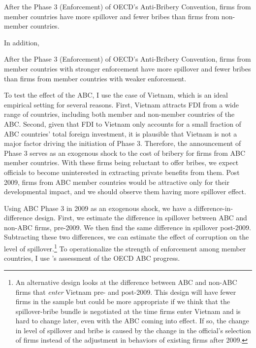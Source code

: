 \begin{hyp}
After the Phase 3 (Enforcement) of OECD's Anti-Bribery Convention, firms from member countries have more spillover and fewer bribes than firms from non-member countries.
\end{hyp}

In addition,

\begin{hyp}
After the Phase 3 (Enforcement) of OECD's Anti-Bribery Convention, firms from member countries with stronger enforcement have more spillover and fewer bribes than firms from member countries with weaker enforcement.
\end{hyp}

To test the effect of the ABC, I use the case of Vietnam, which is an ideal empirical setting for several reasons. First, Vietnam attracts FDI from a wide range of countries, including both member and non-member countries of the ABC. Second, given that FDI to Vietnam only accounts for a small fraction of ABC countries' total foreign investment, it is plausible that Vietnam is not a major factor driving the initiation of Phase 3. Therefore, the announcement of Phase 3 serves as an exogenous shock to the cost of bribery for firms from ABC member countries. With these firms being reluctant to offer bribes, we expect officials to become uninterested in extracting private benefits from them. Post 2009, firms from ABC member countries would be attractive only for their developmental impact, and we should observe them having more spillover effect.

Using ABC Phase 3 in 2009 as an exogenous shock, we have a difference-in-difference design. First, we estimate the difference in spillover between ABC and non-ABC firms, pre-2009. We then find the same difference in spillover post-2009. Subtracting these two differences, we can estimate the effect of corruption on the level of spillover.\footnote{An alternative design looks at the difference between ABC and non-ABC firms that \textit{enter} Vietnam pre- and post-2009. This design will have fewer firms in the sample but could be more appropriate if we think that the spillover-bribe bundle is negotiated at the time firms enter Vietnam and is hard to change later, even with the ABC coming into effect. If so, the change in level of spillover and bribe is caused by the change in the official's selection of firms instead of the adjustment in behaviors of existing firms after 2009.} To operationalize the strength of enforcement among member countries, I use \citet{Heimann2013}'s assessment of the OECD ABC progress.


